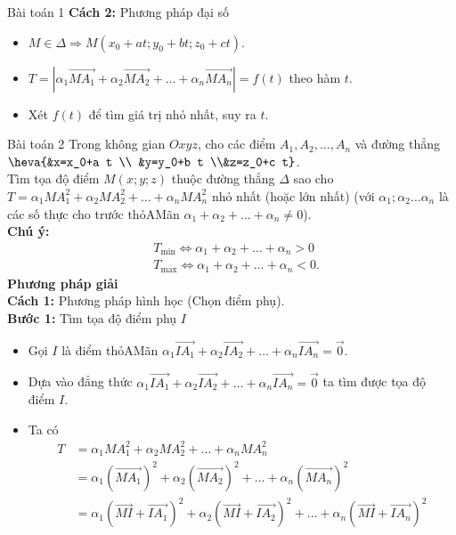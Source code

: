 \begin{dang}{Bài toán 1}
\textbf{Cách 2:} Phương pháp đại số
\begin{itemize}
	\item $M \in \Delta \Rightarrow M\left(x_0+a t ; y_0+b t ; z_0+c t\right)$.
	\item $T=\left|\alpha_1 \vec{MA_1}+\alpha_2 \vec{MA_2}+\ldots+\alpha_n \vec{MA_n}\right|=f(t)$ theo hàm $t$.
	\item Xét $f(t)$ để tìm giá trị nhỏ nhất, suy ra $t$.
\end{itemize}
\end{dang}

\begin{dang}{Bài toán 2}
Trong không gian $Oxyz$, cho các điểm $A_1, A_2, \ldots, A_n$ và đường thẳng
$\heva{&x=x_0+a t \\ &y=y_0+b t \\&z=z_0+c t}$.
\\
Tìm tọa độ điểm $M(x ; y ; z)$ thuộc đường thẳng $\Delta$ sao cho $T=\alpha_1 MA_1^2+\alpha_2 MA_2^2+\ldots+\alpha_n MA_n^2$ nhỏ nhất (hoặc lớn nhất) (với $\alpha_1 ; \alpha_2 \ldots \alpha_n$ là các số thực cho trước thỏAMãn $\alpha_1+\alpha_2+\ldots+\alpha_n \neq 0$).
\\
\textbf{Chú ý:}
\begin{align*}
	& T_{\min } \Leftrightarrow \alpha_1+\alpha_2+\ldots+\alpha_n>0 \\
	& T_{\max } \Leftrightarrow \alpha_1+\alpha_2+\ldots+\alpha_n<0.
\end{align*}
\textbf{Phương pháp giải}
\\
\textbf{Cách 1:} Phương pháp hình học (Chọn điểm phụ).
\\
\textbf{Bước 1:} Tìm tọa độ điểm phụ $I$
\begin{itemize}
	\item Gọi $I$ là điểm thỏAMãn $\alpha_1 \vec{IA_1}+\alpha_2 \vec{IA_2}+\ldots+\alpha_n \vec{IA_n}=\vec{0}$.
	\item Dựa vào đẳng thức $\alpha_1 \vec{IA_1}+\alpha_2 \vec{IA_2}+\ldots+\alpha_n \vec{IA_n}=\vec{0}$ ta tìm được tọa độ điểm $I$.
	\item Ta có
	\begin{align*}
		T & =\alpha_1 MA_1^2+\alpha_2 MA_2^2+\ldots+\alpha_n MA_n^2 \\
		& =\alpha_1\left(\vec{MA_1}\right)^2+\alpha_2\left(\vec{MA_2}\right)^2+\ldots+\alpha_n\left(\vec{MA_n}\right)^2 \\
		& =\alpha_1\left(\vec{MI}+\vec{IA_1}\right)^2+\alpha_2\left(\vec{MI}+\vec{IA_2}\right)^2+\ldots+\alpha_n\left(\vec{MI}+\vec{IA_n}\right)^2 \\

\end{align*}
\end{itemize}
\end{dang}
